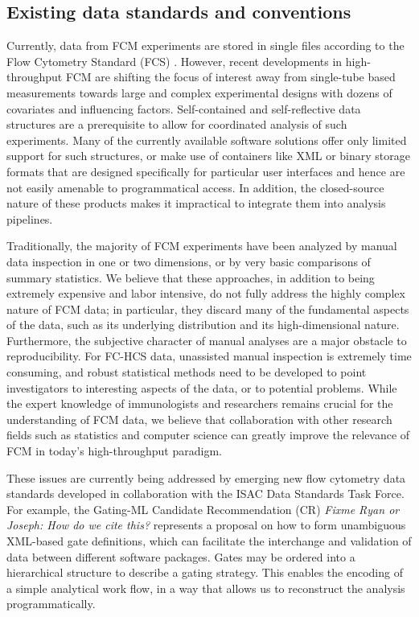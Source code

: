 \documentclass[12pt]{article}
\begin{document}
\subsection*{Existing data standards and conventions}
Currently, data from FCM experiments are stored in single files
according to the Flow Cytometry Standard (FCS) \citep{seamer1997pnd}.
However, recent developments in high-throughput FCM are shifting the
focus of interest away from single-tube based measurements towards
large and complex experimental designs with dozens of covariates and
influencing factors. Self-contained and self-reflective data
structures are a prerequisite to allow for coordinated analysis of
such experiments. Many of the currently available software solutions
offer only limited support for such structures, or make use of
containers like XML or binary storage formats that are designed
specifically for particular user interfaces and hence are not easily
amenable to programmatical access. In addition, the closed-source
nature of these products makes it impractical to integrate them into
analysis pipelines.

Traditionally, the majority of FCM experiments have been analyzed by
manual data inspection in one or two dimensions, or by very basic
comparisons of summary statistics. We believe that these approaches,
in addition to being extremely expensive and labor intensive, do not
fully address the highly complex nature of FCM data; in particular,
they discard many of the fundamental aspects of the data, such as its
underlying distribution and its high-dimensional nature. Furthermore,
the subjective character of manual analyses are a major obstacle to
reproducibility. For FC-HCS data, unassisted manual inspection is
extremely time consuming, and robust statistical methods need to be
developed to point investigators to interesting aspects of the data,
or to potential problems. While the expert knowledge of immunologists
and researchers remains crucial for the understanding of FCM data, we
believe that collaboration with other research fields such as
statistics and computer science can greatly improve the relevance of
FCM in today's high-throughput paradigm.

These issues are currently being addressed by emerging new flow
cytometry data standards developed in collaboration with the ISAC Data
Standards Task Force.  For example, the Gating-ML Candidate
Recommendation (CR) \textit{Fixme Ryan or Joseph: How do we cite
  this?}  represents a proposal on how to form unambiguous XML-based
gate definitions, which can facilitate the interchange and validation
of data between different software packages. Gates may be ordered into
a hierarchical structure to describe a gating strategy. This enables
the encoding of a simple analytical work flow, in a way that allows us
to reconstruct the analysis programmatically.
\end{document}
